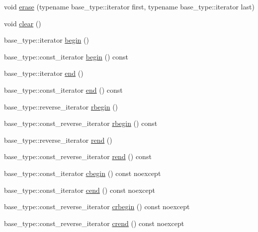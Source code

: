\begin{DoxyCompactItemize}
\item 
void \hyperlink{classIceBRG_1_1insertion__ordered__map_abb85fef2c1e44d0520e2efdb7699db7d}{erase} (typename base\+\_\+type\+::iterator first, typename base\+\_\+type\+::iterator last)
\item 
void \hyperlink{classIceBRG_1_1insertion__ordered__map_a3a6fa53a6c6578733b7f729d49e2c391}{clear} ()
\item 
base\+\_\+type\+::iterator \hyperlink{classIceBRG_1_1insertion__ordered__map_a0bd85eb4ac19d20755a9fbca7bd8db23}{begin} ()
\item 
base\+\_\+type\+::const\+\_\+iterator \hyperlink{classIceBRG_1_1insertion__ordered__map_a6646f2d8d8a08f81f493e2219a1d52dd}{begin} () const 
\item 
base\+\_\+type\+::iterator \hyperlink{classIceBRG_1_1insertion__ordered__map_afeeef9703456b344be94f4e56c022f43}{end} ()
\item 
base\+\_\+type\+::const\+\_\+iterator \hyperlink{classIceBRG_1_1insertion__ordered__map_a5f7e155d87a08ccbd3653c551b3a5798}{end} () const 
\item 
base\+\_\+type\+::reverse\+\_\+iterator \hyperlink{classIceBRG_1_1insertion__ordered__map_a76b8f47594ac40b1e9bec80200d5ca9b}{rbegin} ()
\item 
base\+\_\+type\+::const\+\_\+reverse\+\_\+iterator \hyperlink{classIceBRG_1_1insertion__ordered__map_af409619627087dd11590efa689d87dfa}{rbegin} () const 
\item 
base\+\_\+type\+::reverse\+\_\+iterator \hyperlink{classIceBRG_1_1insertion__ordered__map_a458a31e9b5d99590a065941afdf96d7f}{rend} ()
\item 
base\+\_\+type\+::const\+\_\+reverse\+\_\+iterator \hyperlink{classIceBRG_1_1insertion__ordered__map_ae6ab82fa2fc00e18ff85b581ee25f8a0}{rend} () const 
\item 
base\+\_\+type\+::const\+\_\+iterator \hyperlink{classIceBRG_1_1insertion__ordered__map_a593d829149fca5a801f3d7b7d96ee20c}{cbegin} () const  noexcept
\item 
base\+\_\+type\+::const\+\_\+iterator \hyperlink{classIceBRG_1_1insertion__ordered__map_afa62e1a0c2aa91ed355368a4f392c25b}{cend} () const  noexcept
\item 
base\+\_\+type\+::const\+\_\+reverse\+\_\+iterator \hyperlink{classIceBRG_1_1insertion__ordered__map_a7ace245ef4b1550af7a030b72841c205}{crbegin} () const  noexcept
\item 
base\+\_\+type\+::const\+\_\+reverse\+\_\+iterator \hyperlink{classIceBRG_1_1insertion__ordered__map_abe4b2fcd77cbea56e737b9e9d47865a2}{crend} () const  noexcept

\end{DoxyCompactItemize}
